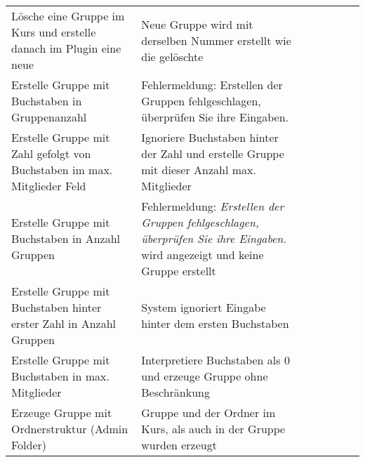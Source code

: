 \begin{table}[]
\begin{tabular}{p{6cm}p{7cm}p{3cm}llll}
      	Lösche eine Gruppe im Kurs und erstelle danach im Plugin eine neue                                                                   & Neue Gruppe wird mit derselben Nummer erstellt wie die gelöschte                                                                                                 & \checkmark           &  &  &  \\
		Erstelle Gruppe mit Buchstaben in Gruppenanzahl                                                                                      & Fehlermeldung{:} Erstellen der Gruppen fehlgeschlagen, überprüfen Sie ihre Eingaben.                                                                               & \checkmark           &  &  &  \\
		Erstelle Gruppe mit Zahl gefolgt von Buchstaben im max. Mitglieder Feld                                                               & Ignoriere Buchstaben hinter der Zahl und erstelle Gruppe mit dieser Anzahl max. Mitglieder                                                                         & \checkmark           &  &  &  \\
		Erstelle Gruppe mit Buchstaben in Anzahl Gruppen                                                                                     & Fehlermeldung: \textit{Erstellen der Gruppen fehlgeschlagen, überprüfen Sie ihre Eingaben.}  wird angezeigt und keine Gruppe erstellt                                    & \checkmark           &  &  &  \\
		Erstelle Gruppe mit Buchstaben hinter erster Zahl in Anzahl Gruppen                                                                  & System ignoriert Eingabe hinter dem ersten Buchstaben                                                                                                           & \checkmark           &  &  &  \\
		Erstelle Gruppe mit Buchstaben in max. Mitglieder                                                                                     & Interpretiere Buchstaben als 0 und erzeuge Gruppe ohne Beschränkung                                                                                                & \checkmark           &  &  &  \\
		Erzeuge Gruppe mit Ordnerstruktur (Admin Folder)                                                                                     & Gruppe und der Ordner im Kurs, als auch in der Gruppe wurden erzeugt                                                                                              & \checkmark           &  &  &  \\
			\end{tabular}
\end{table}

